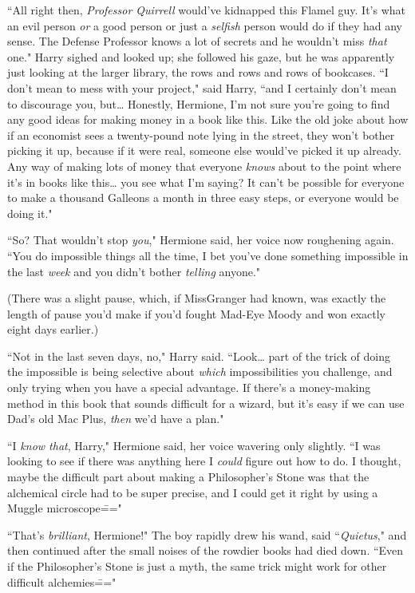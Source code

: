 ``All right then, \emph{Professor Quirrell} would've kidnapped this Flamel guy. It's what an evil person \emph{or} a good person or just a \emph{selfish} person would do if they had any sense. The Defense Professor knows a lot of secrets and he wouldn't miss \emph{that} one." Harry sighed and looked up; she followed his gaze, but he was apparently just looking at the larger library, the rows and rows and rows of bookcases. ``I don't mean to mess with your project," said Harry, ``and I certainly don't mean to discourage you, but{\ldots} Honestly, Hermione, I'm not sure you're going to find any good ideas for making money in a book like this. Like the old joke about how if an economist sees a twenty-pound note lying in the street, they won't bother picking it up, because if it were real, someone else would've picked it up already. Any way of making lots of money that everyone \emph{knows} about to the point where it's in books like this{\ldots} you see what I'm saying? It can't be possible for everyone to make a thousand Galleons a month in three easy steps, or everyone would be doing it."

``So? That wouldn't stop \emph{you}," Hermione said, her voice now roughening again. ``You do impossible things all the time, I bet you've done something impossible in the last \emph{week} and you didn't bother \emph{telling} anyone."

(There was a slight pause, which, if Miss\?Granger had known, was exactly the length of pause you'd make if you'd fought Mad-Eye Moody and won exactly eight days earlier.)

``Not in the last seven days, no," Harry said. ``Look{\ldots} part of the trick of doing the impossible is being selective about \emph{which} impossibilities you challenge, and only trying when you have a special advantage. If there's a money-making method in this book that sounds difficult for a wizard, but it's easy if we can use Dad's old Mac Plus, \emph{then} we'd have a plan."

``I \emph{know that}, Harry," Hermione said, her voice wavering only slightly. ``I was looking to see if there was anything here I \emph{could} figure out how to do. I thought, maybe the difficult part about making a Philosopher's Stone was that the alchemical circle had to be super precise, and I could get it right by using a Muggle microscope\==="

``That's \emph{brilliant}, Hermione!" The boy rapidly drew his wand, said ``\emph{Quietus}," and then continued after the small noises of the rowdier books had died down. ``Even if the Philosopher's Stone is just a myth, the same trick might work for other difficult alchemies\==="


